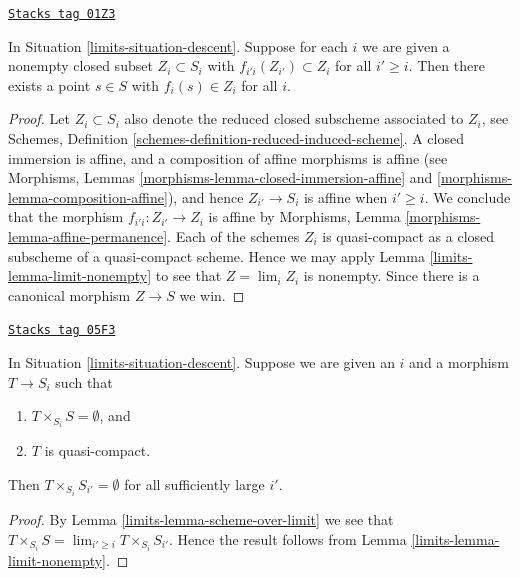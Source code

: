 \begin{lemma}
\label{limits-lemma-limit-closed-nonempty}
\href{https://stacks.math.columbia.edu/tag/01Z3}{\texttt{Stacks tag 01Z3}}

In Situation \ref{limits-situation-descent}.
Suppose for each $i$ we are given a nonempty closed subset
$Z_i \subset S_i$ with $f_{i'i}(Z_{i'}) \subset Z_i$ for all
$i' \geq i$.
Then there exists a point $s \in S$ with $f_i(s) \in Z_i$ for
all $i$.
\end{lemma}

\begin{proof}

Let $Z_i \subset S_i$ also denote the reduced closed subscheme
associated to $Z_i$, see Schemes,
Definition \ref{schemes-definition-reduced-induced-scheme}.
A closed immersion is affine, and a composition of affine
morphisms is affine (see
Morphisms, Lemmas \ref{morphisms-lemma-closed-immersion-affine}
and \ref{morphisms-lemma-composition-affine}), and hence $Z_{i'} \to S_i$ is
affine when $i' \geq i$. We conclude that the morphism
$f_{i'i} : Z_{i'} \to Z_i$ is affine by
Morphisms, Lemma \ref{morphisms-lemma-affine-permanence}.
Each of the schemes $Z_i$ is quasi-compact as a closed
subscheme of a quasi-compact scheme. Hence we may apply
Lemma \ref{limits-lemma-limit-nonempty} to see that
$Z = \lim_i Z_i$ is nonempty. Since there is a
canonical morphism $Z \to S$ we win.
\end{proof}

\begin{lemma}
\label{limits-lemma-limit-fibre-product-empty}
\href{https://stacks.math.columbia.edu/tag/05F3}{\texttt{Stacks tag 05F3}}

In Situation \ref{limits-situation-descent}.
Suppose we are given an $i$ and a morphism $T \to S_i$ such that
\begin{enumerate}
\item $T \times_{S_i} S = \emptyset$, and
\item $T$ is quasi-compact.
\end{enumerate}
Then $T \times_{S_i} S_{i'} = \emptyset$ for all sufficiently large $i'$.
\end{lemma}

\begin{proof}

By Lemma \ref{limits-lemma-scheme-over-limit}
we see that $T \times_{S_i} S = \lim_{i' \geq i} T \times_{S_i} S_{i'}$.
Hence the result follows from
Lemma \ref{limits-lemma-limit-nonempty}.
\end{proof}

